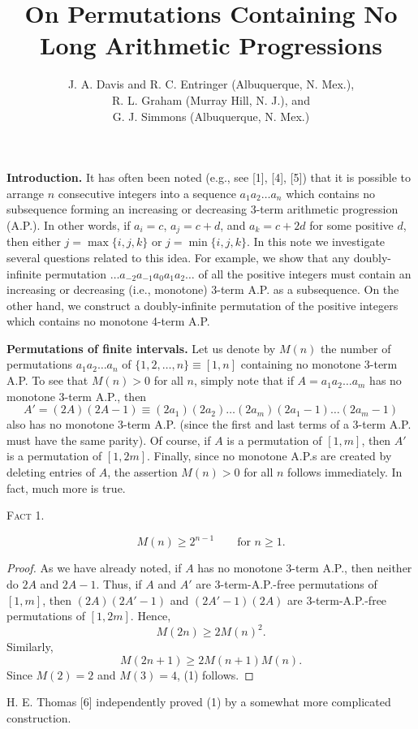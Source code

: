 \documentclass[10pt]{article}
\title{On Permutations Containing No Long Arithmetic Progressions}
\author{%
  J. A. Davis and R. C. Entringer (Albuquerque, N. Mex.),\\
  R. L. Graham (Murray Hill, N. J.), and\\
  G. J. Simmons (Albuquerque, N. Mex.)}
\date{}
\newcommand{\fact}[1]{\par\medskip\noindent\textsc{Fact #1.}\par\smallskip}
\begin{document}
\maketitle

\noindent\textbf{Introduction.}
It has often been noted (e.g., see [1], [4], [5]) that it is possible to
arrange $n$ consecutive integers into a sequence
$a_1a_2\ldots a_n$ which contains no subsequence forming an increasing or
decreasing 3-term arithmetic progression (A.P.). In other words, if
$a_i=c$, $a_j=c+d$, and $a_k=c+2d$ for some positive $d$, then either
$j=\max\{i,j,k\}$ or $j=\min\{i,j,k\}$. In this note we investigate
several questions related to this idea. For example, we show that any
doubly-infinite permutation
$\ldots a_{-2}a_{-1}a_0a_1a_2\ldots$ of all the positive integers must
contain an increasing or decreasing (i.e., monotone) 3-term A.P. as a
subsequence. On the other hand, we construct a doubly-infinite
permutation of the positive integers which contains no monotone 4-term
A.P.

\medskip
\noindent\textbf{Permutations of finite intervals.}
Let us denote by $M(n)$ the number of permutations $a_1a_2\ldots a_n$ of
$\{1,2,\ldots,n\}\equiv[1,n]$ containing no monotone 3-term A.P. To see
that $M(n)>0$ for all $n$, simply note that if
$A=a_1a_2\ldots a_m$ has no monotone 3-term A.P., then
\[
 A'=(2A)(2A-1)
   \equiv (2a_1)(2a_2)\ldots(2a_m)
   (2a_1-1)\ldots(2a_m-1)
\]
also has no monotone 3-term A.P. (since the first and last terms of a
3-term A.P. must have the same parity). Of course, if $A$ is a
permutation of $[1,m]$, then $A'$ is a permutation of $[1,2m]$.
Finally, since no monotone A.P.s are created by deleting entries of $A$,
the assertion $M(n)>0$ for all $n$ follows immediately. In fact, much
more is true.

\fact{1}
\begin{equation}
 M(n)\ge 2^{n-1}\qquad\text{for }n\ge1.
 \tag{1}
\end{equation}

\begin{proof}
As we have already noted, if $A$ has no monotone 3-term A.P., then neither
do $2A$ and $2A-1$. Thus, if $A$ and $A'$ are 3-term-A.P.-free
permutations of $[1,m]$, then $(2A)(2A'-1)$ and $(2A'-1)(2A)$ are
3-term-A.P.-free permutations of $[1,2m]$. Hence,
\[
 M(2n)\ge 2M(n)^2.
\]
Similarly,
\[
 M(2n+1)\ge 2M(n+1)M(n).
\]
Since $M(2)=2$ and $M(3)=4$, (1) follows.
\end{proof}

H. E. Thomas [6] independently proved (1) by a somewhat more complicated
construction.
\end{document}
